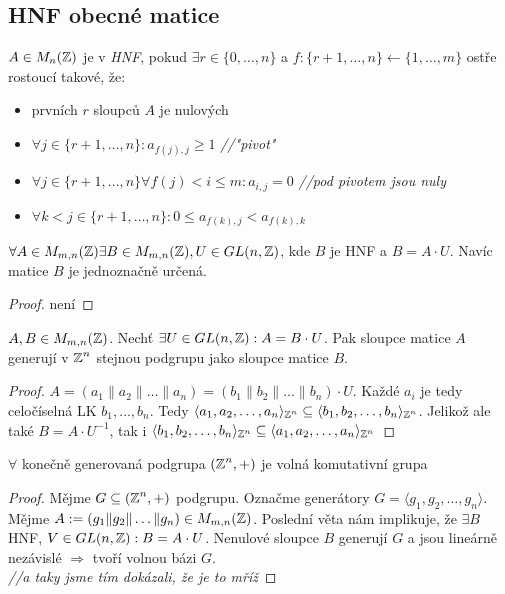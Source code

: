 \subsection{HNF obecné matice}
\begin{definition}
    $A \in M_n(\operatorname{\mathbb{Z}})$ je v \emph{HNF}, pokud $\exists r \in \{0, \dots, n\}$ a $f: \{r+1, \dots, n\} \leftarrow \{1, \dots, m\}$ ostře rostoucí takové, že:
    \begin{itemize}
        \item prvních $r$ sloupců $A$ je nulových
        \item $\forall j \in \{r+1, \dots, n\}: a_{f(j),j} \geq 1$ \textit{//"pivot"}
        \item $\forall j \in \{r+1, \dots, n\} \forall f(j) < i \leq m: a_{i,j} = 0$ \textit{//pod pivotem jsou nuly}
        \item $\forall k < j \in \{r+1, \dots, n\}: 0 \leq a_{f(k),j} < a_{f(k), k}$
    \end{itemize} 
\end{definition}
\begin{theorem}
    $\forall A \in M_{m,n}(\operatorname{\mathbb{Z}}) \exists B \in M_{m,n}(\operatorname{\mathbb{Z}}), U \in GL(n,\operatorname{\mathbb{Z}})$, kde $B$ je HNF a $B = A\cdot U$. Navíc matice $B$ je jednoznačně určená.
\end{theorem}
\begin{proof}
    není
\end{proof}
\begin{claim}
    $A,B \in M_{m,n}(\operatorname{\mathbb{Z}})$. Nechť $\exists U \in GL(n,\operatorname{\mathbb{Z}}): A = B\cdot U$. Pak sloupce matice $A$ generují v $\operatorname{\mathbb{Z}}^n$ stejnou podgrupu jako sloupce matice $B$.
\end{claim}
\begin{proof}
    $ A = (a_1\|a_2\|\dots \|a_n) = (b_1\|b_2\|\dots \| b_n) \cdot U$. Každé $a_i$ je tedy celočíselná LK $b_1, \dots, b_n$. Tedy $\langle a_1, a_2, \dots, a_n \rangle_{\operatorname{\mathbb{Z}}^n} \subseteq \langle b_1, b_2, \dots, b_n \rangle_{\operatorname{\mathbb{Z}}^n}$. 
    Jelikož ale také $B = A \cdot U^{-1}$, tak i $\langle b_1, b_2, \dots, b_n \rangle_{\operatorname{\mathbb{Z}}^n} \subseteq \langle a_1, a_2, \dots, a_n \rangle_{\operatorname{\mathbb{Z}}^n}$
\end{proof}

\begin{consequence}
    $\forall$ konečně generovaná podgrupa $(\operatorname{\mathbb{Z}}^n, +)$ je volná komutativní grupa
\end{consequence}
\begin{proof}
    Mějme $G \subseteq (\operatorname{\mathbb{Z}}^n,+)$ podgrupu. Označme generátory $G = \langle g_1, g_2, \dots, g_n \rangle$. Mějme $A:= (g_1\|g_2\|\dots \|g_n) \in M_{m,n}(\operatorname{\mathbb{Z}})$.
    Poslední věta nám implikuje, že $\exists B$ HNF, $V \in GL(n,\operatorname{\mathbb{Z}}): B = A\cdot U$. Nenulové sloupce $B$ generují $G$ a jsou lineárně nezávislé $\Rightarrow$ tvoří volnou bázi $G$. \\ \textit{//a taky jsme tím dokázali, že je to mříž}
\end{proof}